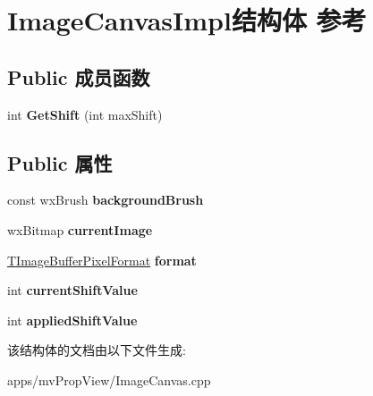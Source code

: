 \hypertarget{struct_image_canvas_impl}{\section{Image\+Canvas\+Impl结构体 参考}
\label{struct_image_canvas_impl}
}
\subsection*{Public 成员函数}
\begin{DoxyCompactItemize}
\item 
\hypertarget{struct_image_canvas_impl_a928c72fb01d6f3ba136486ba5a44d229}{int {\bfseries Get\+Shift} (int max\+Shift)}\label{struct_image_canvas_impl_a928c72fb01d6f3ba136486ba5a44d229}

\end{DoxyCompactItemize}
\subsection*{Public 属性}
\begin{DoxyCompactItemize}
\item 
\hypertarget{struct_image_canvas_impl_a9a4c5fa1cd7f76c8c2e076adf57bd426}{const wx\+Brush {\bfseries background\+Brush}}\label{struct_image_canvas_impl_a9a4c5fa1cd7f76c8c2e076adf57bd426}

\item 
\hypertarget{struct_image_canvas_impl_a6b7542db98c232fef58d6087bee6971f}{wx\+Bitmap {\bfseries current\+Image}}\label{struct_image_canvas_impl_a6b7542db98c232fef58d6087bee6971f}

\item 
\hypertarget{struct_image_canvas_impl_aab0a72d91a03dce844490d5fde672369}{\hyperlink{group___common_interface_ga456e8aa76e06bb761f27c52141475985}{T\+Image\+Buffer\+Pixel\+Format} {\bfseries format}}\label{struct_image_canvas_impl_aab0a72d91a03dce844490d5fde672369}

\item 
\hypertarget{struct_image_canvas_impl_af06f173d79e28f88db8d70fc86e5c308}{int {\bfseries current\+Shift\+Value}}\label{struct_image_canvas_impl_af06f173d79e28f88db8d70fc86e5c308}

\item 
\hypertarget{struct_image_canvas_impl_a3ba123ba8d9371ce1386ca0954b76099}{int {\bfseries applied\+Shift\+Value}}\label{struct_image_canvas_impl_a3ba123ba8d9371ce1386ca0954b76099}

\end{DoxyCompactItemize}


该结构体的文档由以下文件生成\+:\begin{DoxyCompactItemize}
\item 
apps/mv\+Prop\+View/Image\+Canvas.\+cpp\end{DoxyCompactItemize}
